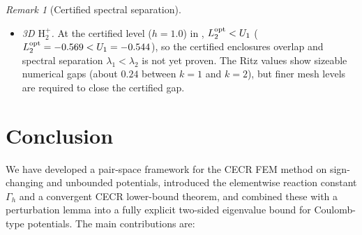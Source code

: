 \documentclass[11pt]{article}
\theoremstyle{plain}
\theoremstyle{definition}
\theoremstyle{remark}
\newtheorem{remark}{Remark}
\begin{document}
\begin{remark}[Certified spectral separation]
\begin{itemize}
  (width $0.150$), bracketing the exact $\lambda_1=-0.250$.
  The Ritz values $\mu_{k,h}^{\sigma_{\rm opt}}-\sigma_{\rm opt}$ show
  three closely spaced values near $-0.30$, consistent with the
  near-degeneracy of the lowest eigenstates of hydrogen on $B(0,6)$.
\item \emph{3D $\mathrm{H}_2^+$.}
  At the certified level ($h=1.0$) in ,
  $L_2^{\rm opt}<U_1$ ($L_2^{\rm opt}=-0.569<U_1=-0.544$),
  so the certified enclosures overlap and spectral separation
  $\lambda_1<\lambda_2$ is not yet proven.
  The Ritz values show sizeable numerical gaps
  (about $0.24$ between $k=1$ and $k=2$),
  but finer mesh levels are required to close the certified gap.
\end{itemize}
\end{remark}


\section{Conclusion}
\label{sec:conclusion}

We have developed a pair-space framework for the CECR FEM method on
sign-changing and unbounded potentials, introduced the elementwise
reaction constant $\Gamma_h$ and a convergent CECR lower-bound
theorem, and combined these with a perturbation lemma into a fully
explicit two-sided eigenvalue bound for Coulomb-type potentials.
The main contributions are:
\end{document}
